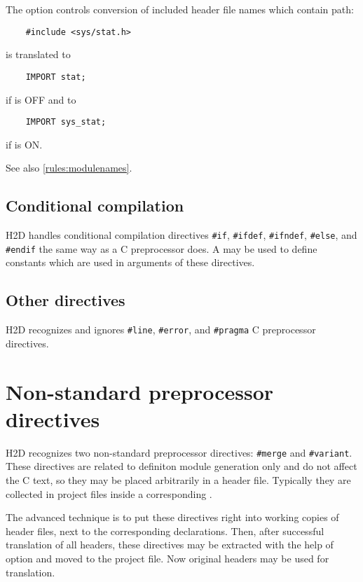 The  option controls conversion of included header
file names which contain path:

\verb'    #include <sys/stat.h>'

is translated to

\verb'    IMPORT stat;    '

if  is OFF and to

\verb'    IMPORT sys_stat;'

if  is ON.

See also \ref{rules:modulenames}.

\subsection{Conditional compilation}
\label{rules:pp:conditional}

H2D handles conditional compilation directives {\tt \#if}, {\tt \#ifdef},
{\tt \#ifndef}, {\tt \#else}, and {\tt \#endif} the same way as a C preprocessor
does. A \ProjectFile{} may be used to define constants which are used
in arguments of these directives.

\subsection{Other directives}
\label{rules:pp:other}

H2D recognizes and ignores {\tt \#line}, {\tt \#error}, and {\tt \#pragma}
C preprocessor directives.

\section{Non-standard preprocessor directives}
\label{rules:nonstandard}

H2D recognizes two non-standard preprocessor
directives: {\tt \#merge} and {\tt \#variant}.
These directives are related to definiton module
generation only and do not affect the C text, so they may be placed
arbitrarily in a header file. Typically they are collected
in project files inside a corresponding .

The advanced technique is to put these directives right into working
copies of header files, next to the corresponding declarations.
Then, after successful translation of all headers, these
directives may be extracted with the help of 
option and moved to the project file. Now original headers
may be used for translation.

